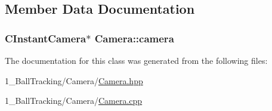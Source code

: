 \subsection{Member Data Documentation}
\subsubsection[{\texorpdfstring{camera}{camera}}]{\setlength{\rightskip}{0pt plus 5cm}C\+Instant\+Camera$\ast$ Camera\+::camera\hspace{0.3cm}{\ttfamily [protected]}}\hypertarget{class_camera_ade18caead38b42ad3ea4ca3816452996}{}\label{class_camera_ade18caead38b42ad3ea4ca3816452996}


The documentation for this class was generated from the following files\+:\begin{DoxyCompactItemize}
\item 
1\+\_\+\+Ball\+Tracking/\+Camera/\hyperlink{_camera_8hpp}{Camera.\+hpp}\item 
1\+\_\+\+Ball\+Tracking/\+Camera/\hyperlink{_camera_8cpp}{Camera.\+cpp}\end{DoxyCompactItemize}
